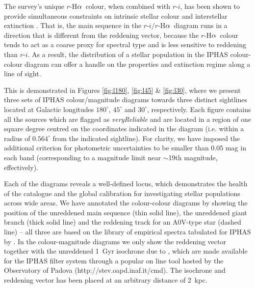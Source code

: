 \documentclass[useAMS,usenatbib]{mn2e}
\def\ha{\mbox{H$\rm \alpha$}}
\begin{document}
The survey's unique $r$-\ha\ colour,
when combined with $r$-$i$,
has been shown to provide simultaneous constraints 
on intrinsic stellar colour and interstellar extinction \citep{Drew2008}. 
That is, the main sequence in the $r$-$i$/$r$-\ha\ diagram
runs in a direction that is different from the reddening vector,
because the $r$-\ha\ colour tends to act as a coarse proxy for spectral type
and is less sensitive to reddening than $r$-$i$.
As a result, the distribution of a stellar population
in the IPHAS colour-colour diagram
can offer a handle on the properties and extinction regime
along a line of sight.

This is demonstrated in Figures \ref{fig:l180}, \ref{fig:l45} \& \ref{fig:l30},
where we present three sets of IPHAS colour/magnitude diagrams
towards three distinct sightlines
located at Galactic longitudes $180^\circ$, $45^\circ$ and $30^\circ$,
respectively.
Each figure contains all the sources which are flagged as \emph{veryReliable}
and are located in a region of one square degree 
centred on the coordinates indicated in the diagram
(i.e. within a radius of $0.564^\circ$ from the indicated sightline).
For clarity, we have imposed the additional criterion
for photometric uncertainties to be smaller than 0.05 mag in each band
(corresponding to a magnitude limit near $\sim$19th magnitude, effectively).

Each of the diagrams reveals a well-defined locus,
which demonstrates the health of the catalogue and the global calibration
for investigating stellar populations across wide areas.
We have annotated the colour-colour diagrams
by showing the position of the unreddened main sequence (thin solid line),
the unreddened giant branch (thick solid line)
and the reddening track for an A0V-type star (dashed line)
-- all three are based on the \cite{Pickles1998} library of empirical spectra
tabulated for IPHAS by \cite{Drew2005}.
In the colour-magnitude diagrams we only show the reddening vector
together with the unreddened 1~Gyr isochrone due to \cite{Bressan2012},
which are made available for the IPHAS filter system through a
popular on line tool hosted by the Observatory of Padova (http://stev.oapd.inaf.it/cmd).
The isochrone and reddening vector has been placed
at an arbitrary distance of 2~kpc.
\end{document}
